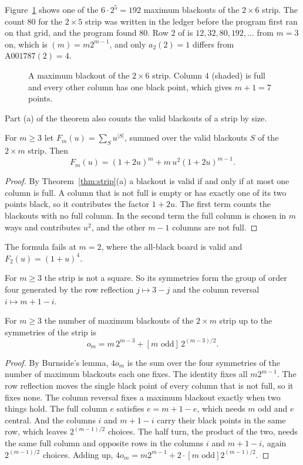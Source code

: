 Figure~\ref{fig:stripmax} shows one of the $6\cdot2^5=192$ maximum blackouts of the
$2\times6$ strip. The count $80$ for the $2\times5$ strip was written in the ledger
before the program first ran on that grid, and the program found $80$.
Row $2$ of  is $12,32,80,192,\ldots$ from $m=3$ on, which is
$(m)=m2^{m-1}$, and only $a_2(2)=1$ differs from
$\mathrm{A001787}(2)=4$.

\begin{figure}[t]
\centering

\caption{A maximum blackout of the $2\times6$ strip. Column $4$ (shaded) is full and
every other column has one black point, which gives $m+1=7$ points.}
\label{fig:stripmax}
\end{figure}

Part (a) of the theorem also counts the valid blackouts of a strip by size.

\begin{proposition}\label{prop:stripsize}
For $m\ge3$ let $F_m(u)=\sum_Su^{|S|}$, summed over the valid blackouts $S$ of the
$2\times m$ strip. Then
\[
F_m(u)=(1+2u)^m+m\,u^2(1+2u)^{m-1}.
\]
\end{proposition}

\begin{proof}
By Theorem~\ref{thm:strip}(a) a blackout is valid if and only if at most one column
is full. A column that is not full is empty or has exactly one of its two points
black, so it contributes the factor $1+2u$. The first term counts the blackouts with
no full column. In the second term the full column is chosen in $m$ ways and
contributes $u^2$, and the other $m-1$ columns are not full.
\end{proof}

The formula fails at $m=2$, where the all-black board is valid and $F_2(u)=(1+u)^4$.

For $m\ge3$ the strip is not a square. So its symmetries form the group of order
four generated by the row reflection $j\mapsto3-j$ and the column reversal
$i\mapsto m+1-i$.

\begin{proposition}[orbits]\label{prop:striporbits}
For $m\ge3$ the number of maximum blackouts of the $2\times m$ strip up to the
symmetries of the strip is
\[
o_m=m\,2^{m-3}+[m\text{ odd}]\,2^{(m-3)/2}.
\]
\end{proposition}

\begin{proof}
By Burnside's lemma, $4o_m$ is the sum over the four symmetries of the number of
maximum blackouts each one fixes. The identity fixes all $m2^{m-1}$. The row
reflection moves the single black point of every column that is not full, so it
fixes none. The column reversal fixes a maximum blackout
exactly when two things hold. The full column $e$ satisfies $e=m+1-e$, which needs
$m$ odd and $e$ central. And the columns $i$ and $m+1-i$ carry their black points in
the same row, which leaves $2^{(m-1)/2}$ choices. The half turn, the product of the
two, needs the same full column and opposite rows in the columns $i$ and $m+1-i$,
again $2^{(m-1)/2}$ choices. Adding up,
$4o_m=m2^{m-1}+2\cdot[m\text{ odd}]2^{(m-1)/2}$.
\end{proof}

